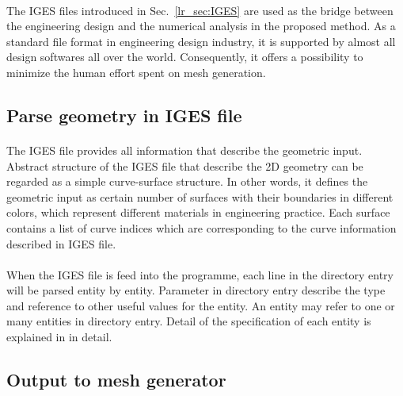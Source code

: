 \paragraph{}
The IGES\cite{IGES1983} files introduced in Sec.~\ref{lr_sec:IGES} are used as the bridge between the engineering design and the numerical analysis in the proposed method.
As a standard file format in engineering design industry, it is supported by almost all design softwares all over the world.
Consequently, it offers a possibility to minimize the human effort spent on mesh generation.

\subsection{Parse geometry in IGES file}
\paragraph{}
The IGES file provides all information that describe the geometric input.
Abstract structure of the IGES file that describe the 2D geometry can be regarded as a simple curve-surface structure.
In other words, it defines the geometric input as certain number of surfaces with their boundaries in different colors, which represent different materials in engineering practice.
Each surface contains a list of curve indices which are corresponding to the curve information described in IGES file.

\paragraph{}
When the IGES file is feed into the programme, each line in the directory entry will be parsed entity by entity.
Parameter in directory entry describe the type and reference to other useful values for the entity.
An entity may refer to one or many entities in directory entry.
Detail of the specification of each entity is explained in \cite{Nasr2007} in detail.

\subsection{Output to mesh generator}
\label{qdt_section:iges_output}

